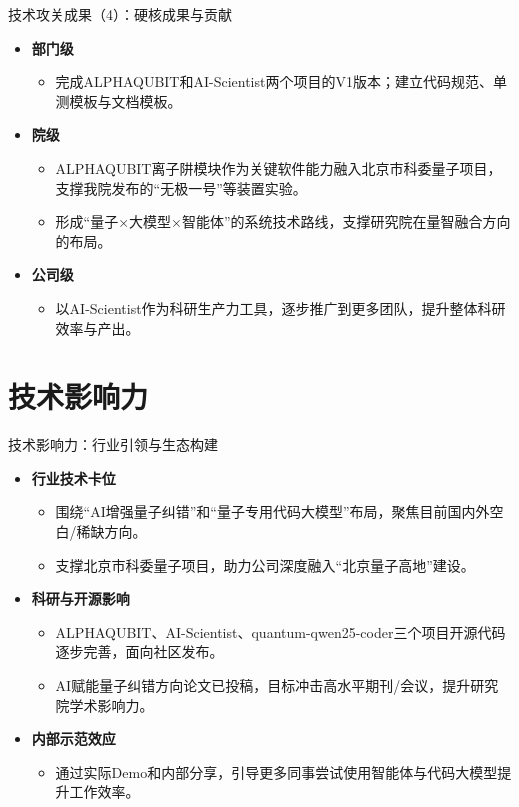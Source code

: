 \documentclass[aspectratio=169]{beamer} %
\begin{document}
\begin{frame}{技术攻关成果（4）：硬核成果与贡献}
    \begin{itemize}
        \item \textbf{部门级}
        \begin{itemize}
            \item 完成ALPHAQUBIT和AI-Scientist两个项目的V1版本；建立代码规范、单测模板与文档模板。
        \end{itemize}
        \item \textbf{院级}
        \begin{itemize}
            \item ALPHAQUBIT离子阱模块作为关键软件能力融入北京市科委量子项目，支撑我院发布的“无极一号”等装置实验。
            \item 形成“量子×大模型×智能体”的系统技术路线，支撑研究院在量智融合方向的布局。
        \end{itemize}
        \item \textbf{公司级}
        \begin{itemize}
            \item 以AI-Scientist作为科研生产力工具，逐步推广到更多团队，提升整体科研效率与产出。
        \end{itemize}
    \end{itemize}
\end{frame}

\section{技术影响力}
\begin{frame}{技术影响力：行业引领与生态构建}
    \begin{itemize}
        \item \textbf{行业技术卡位}
        \begin{itemize}
            \item 围绕“AI增强量子纠错”和“量子专用代码大模型”布局，聚焦目前国内外空白/稀缺方向。
            \item 支撑北京市科委量子项目，助力公司深度融入“北京量子高地”建设。
        \end{itemize}
        \item \textbf{科研与开源影响}
        \begin{itemize}
            \item ALPHAQUBIT、AI-Scientist、quantum-qwen25-coder三个项目开源代码逐步完善，面向社区发布。
            \item AI赋能量子纠错方向论文已投稿，目标冲击高水平期刊/会议，提升研究院学术影响力。
        \end{itemize}
        \item \textbf{内部示范效应}
        \begin{itemize}
            \item 通过实际Demo和内部分享，引导更多同事尝试使用智能体与代码大模型提升工作效率。
        \end{itemize}
    \end{itemize}
\end{frame}
\end{document}
